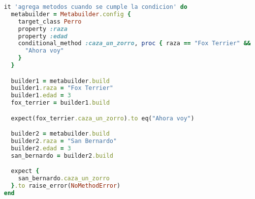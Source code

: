 \documentclass[spanish,a4paper]{article}
\begin{document}
  \begin{lstlisting}[language=Ruby]
it 'agrega metodos cuando se cumple la condicion' do
  metabuilder = Metabuilder.config {
    target_class Perro
    property :raza
    property :edad
    conditional_method :caza_un_zorro, proc { raza == "Fox Terrier" && edad > 2 }, proc {
      "Ahora voy"
    }
  }

  builder1 = metabuilder.build
  builder1.raza = "Fox Terrier"
  builder1.edad = 3
  fox_terrier = builder1.build

  expect(fox_terrier.caza_un_zorro).to eq("Ahora voy")

  builder2 = metabuilder.build
  builder2.raza = "San Bernardo"
  builder2.edad = 3
  san_bernardo = builder2.build

  expect {
    san_bernardo.caza_un_zorro
  }.to raise_error(NoMethodError)
end
  \end{lstlisting}
\end{document}
